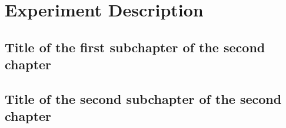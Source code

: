 \chapter{Experiment Description}

\section{Title of the first subchapter of the second chapter}

\section{Title of the second subchapter of the second chapter}
